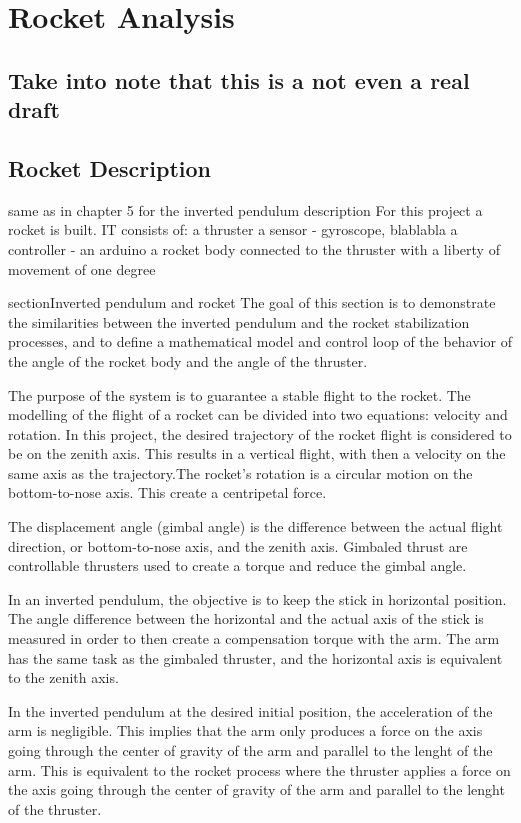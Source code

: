 							\chapter{Rocket Analysis}

		\section{Take into note that this is a not even a real draft}
		
	\section{ Rocket Description}

same as in chapter 5 for the inverted pendulum description
For this project a rocket is built. IT consists of:
a thruster
a sensor - gyroscope, blablabla
a controller - an arduino
a rocket body connected to the thruster with a liberty of movement of one degree

	section{Inverted pendulum and rocket}
The goal of this section is to demonstrate the similarities between the inverted pendulum and the rocket stabilization processes, and to define a mathematical model and control loop of the behavior of the angle of the rocket body and the angle of the thruster.

The purpose of the system is to guarantee a stable flight to the rocket.
The modelling of the flight of a rocket can be divided into two equations: velocity and rotation. In this project, the desired trajectory of the rocket flight is considered to be on the zenith axis. This results in a vertical flight, with then a velocity on the same axis as the trajectory.The rocket's rotation is a circular motion on the bottom-to-nose axis. This create a centripetal force.

The displacement angle (gimbal angle) is the difference between the actual flight direction, or bottom-to-nose axis, and the zenith axis. Gimbaled thrust are controllable thrusters used to create a torque and reduce the gimbal angle. 

In an inverted pendulum, the objective is to keep the stick in horizontal position. The angle difference between the horizontal and the actual axis of the stick is measured in order to then create a compensation torque with the arm. The arm has the same task as the gimbaled thruster, and the horizontal axis is equivalent to the zenith axis.

In the inverted pendulum at the desired initial position, the acceleration of the arm is negligible. This implies that the arm only produces a force on the axis going through the center of gravity of the arm and parallel to the lenght of the arm. This is equivalent to the rocket process where the thruster applies a force on the axis going through the center of gravity of the arm and parallel to the lenght of the thruster. 

